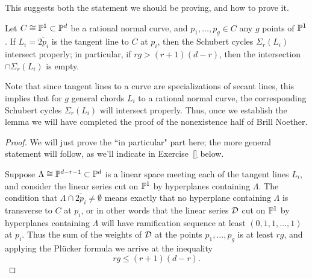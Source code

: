 This suggests both the statement we should be proving, and how to prove it. 

\begin{lemma}
Let $C \cong \PP^1 \subset \PP^d$ be a rational normal curve, and $p_1,\dots,p_g \in C$ any $g$ points of $\PP^1$. If $L_i = \overline{2p_i}$ is the tangent line to $C$ at $p_i$, then the Schubert cycles $\Sigma_r(L_i)$ intersect properly; in particular, if $rg > (r+1)(d-r)$, then the intersection $\cap \Sigma_r(L_i)$ is empty.
\end{lemma}

Note that since tangent lines to a curve are specializations of secant lines, this implies that for $g$ general chords $L_i$ to a rational normal curve, the corresponding Schubert cycles $\Sigma_r(L_i)$ will intersect properly.  Thus, once we establish the lemma we will have completed the proof of the nonexistence half of Brill Noether.

\begin{proof}
We will just prove the ``in particular" part here; the more general statement will follow, as we'll indicate in Exercise~\ref{} below.

Suppose $\Lambda \cong \PP^{d-r-1} \subset \PP^d$ is a linear space meeting each of the tangent lines $L_i$, and consider the linear series cut on $\PP^1$ by hyperplanes containing $\Lambda$. The condition that $\Lambda \cap \overline{2p_i} \neq \emptyset$ means exactly that no hyperplane containing $\Lambda$ is transverse to $C$ at $p_i$, or in other words that the linear series $\cD$ cut on $\PP^1$ by hyperplanes containing $\Lambda$ will have ramification sequence at least $(0, 1, 1,\dots,1)$ at $p_i$. Thus the sum of the weights of $\cD$ at the points $p_1,\dots,p_g$ is at least $rg$, and applying the Pl\"ucker formula we arrive at the inequality
$$
rg \leq (r+1)(d-r).
$$
\end{proof}


